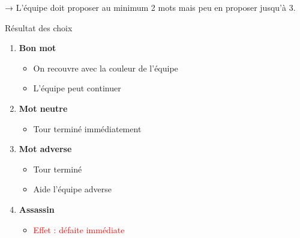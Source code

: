 \documentclass[12pt,a4paper]{article}
\begin{document}
\begin{enumerate}
\begin{enumerate}
                            → L’équipe doit proposer au minimum 2 mots mais peu en proposer jusqu’à 3.

                            \vspace{0.5cm}

                            Résultat des choix

                            \begin{enumerate}

                                \item \textbf{Bon mot}

                                    \begin{itemize}
                                        \item On recouvre avec la couleur de l’équipe
                                        \item L’équipe peut continuer
                                    \end{itemize}

                                \item \textbf{Mot neutre}

                                    \begin{itemize}
                                        \item Tour terminé immédiatement
                                    \end{itemize}

                                \item \textbf{Mot adverse}

                                    \begin{itemize}
                                        \item Tour terminé
                                        \item Aide l’équipe adverse
                                    \end{itemize}

                                \item \textbf{Assassin}

                                    \begin{itemize}
                                        \item \textcolor{red}{Effet : défaite immédiate}
                                    \end{itemize}


\end{enumerate}
\end{enumerate}
\end{enumerate}
\end{document}
